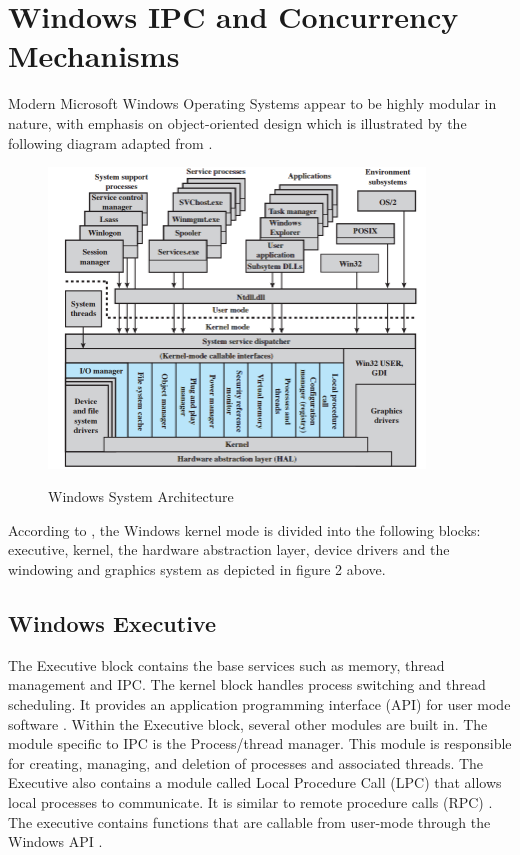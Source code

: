 \documentclass[12pt,a4paper,oneside]{article}
\begin{document}
\section{Windows IPC and Concurrency Mechanisms}  %
\begin{spacing}{1.4}
Modern Microsoft Windows Operating Systems appear to be highly modular in nature, with emphasis on object-oriented design which is illustrated by the following diagram adapted from \cite{WinInt2009}.
\begin{figure}[H]
\includegraphics[width=10cm]{winArch} %
\label{fig:winArch}
\caption{Windows System Architecture}
\end{figure}
According to \cite{OSInternals&DesignPrinciplesStallings}, the Windows kernel mode is divided into the following blocks: executive, kernel, the hardware abstraction layer, device drivers and the windowing and graphics system as depicted in figure 2 above.

\subsection{Windows Executive}
The Executive block contains the base services such as memory, thread management and IPC. The kernel block handles process switching and thread scheduling. 
It provides an application programming interface (API) for user mode software \citep{OSInternals&DesignPrinciplesStallings}. Within the Executive block, several other modules are built in. The module specific to IPC is the Process/thread manager. This module is responsible for creating, managing, and deletion of processes and associated threads. The Executive also contains a module called Local Procedure Call (LPC) that allows local processes to communicate. It is similar to remote procedure calls (RPC) \citep{OSInternals&DesignPrinciplesStallings}. The executive contains functions that are callable from user-mode through the Windows API \citep{WinInternalsPart12012}.


\end{spacing}
\end{document}
